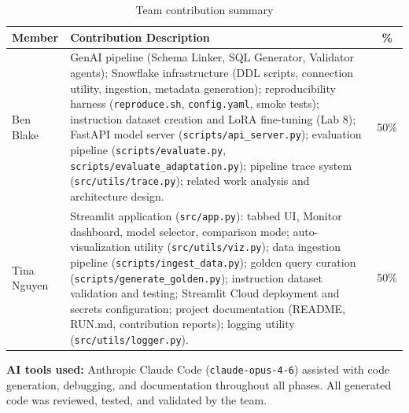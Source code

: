 \documentclass[11pt,letterpaper]{article}
\begin{document}
\begin{table}[H]
\centering\small
\begin{tabular}{@{}p{2.4cm}p{9.6cm}c@{}}
\toprule
\textbf{Member} & \textbf{Contribution Description} & \textbf{\%} \\
\midrule
Ben Blake &
GenAI pipeline (Schema Linker, SQL Generator, Validator agents); Snowflake infrastructure (DDL scripts, connection utility, ingestion, metadata generation); reproducibility harness (\texttt{reproduce.sh}, \texttt{config.yaml}, smoke tests); instruction dataset creation and LoRA fine-tuning (Lab 8); FastAPI model server (\texttt{scripts/api\_server.py}); evaluation pipeline (\texttt{scripts/evaluate.py}, \texttt{scripts/evaluate\_adaptation.py}); pipeline trace system (\texttt{src/utils/trace.py}); related work analysis and architecture design.
& 50\% \\
\addlinespace
Tina Nguyen &
Streamlit application (\texttt{src/app.py}): tabbed UI, Monitor dashboard, model selector, comparison mode; auto-visualization utility (\texttt{src/utils/viz.py}); data ingestion pipeline (\texttt{scripts/ingest\_data.py}); golden query curation (\texttt{scripts/generate\_golden.py}); instruction dataset validation and testing; Streamlit Cloud deployment and secrets configuration; project documentation (README, RUN.md, contribution reports); logging utility (\texttt{src/utils/logger.py}).
& 50\% \\
\bottomrule
\end{tabular}
\caption{Team contribution summary}
\end{table}

\noindent\textbf{AI tools used:} Anthropic Claude Code (\texttt{claude-opus-4-6}) assisted with code generation, debugging, and documentation throughout all phases. All generated code was reviewed, tested, and validated by the team.
\end{document}
